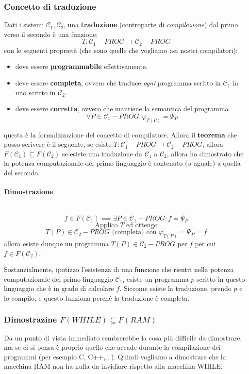\documentclass{article}
\begin{document}
\subsubsection{Concetto di traduzione}
Dati i sistemi $\mathcal{C}_1,\mathcal{C}_2$, una \textbf{traduzione} (controparte di \textit{compilazione}) dal primo verso il secondo è
una funzione:
$$T:\mathcal{C}_1-PROG\rightarrow\mathcal{C}_2-PROG$$
con le seguenti proprietà (che sono quelle che vogliamo nei nostri compilatori):
\begin{itemize}
    \item deve essere \textbf{programmabile} effettivamente.
    \item deve essere \textbf{completa}, ovvero che traduce \textit{ogni} programma scritto in $\mathcal{C}_1$ in
          uno scritto in $\mathcal{C}_2$.
    \item deve essere \textbf{corretta}, ovvero che mantiene la semantica del programma
          $$\forall P\in\mathcal{C}_1-PROG :\varphi_{T(P)}=\Psi_P$$
\end{itemize}
questa è la formalizzazione del concetto di compilatore. Allora il \textbf{teorema} che posso scrivere
è il seguente, se esiste $T:\mathcal{C}_1-PROG\rightarrow\mathcal{C}_2-PROG$, allora $F(\mathcal{C}_1)\subseteq F(\mathcal{C}_2)$
se esiste una traduzione da $\mathcal{C}_1$ a $\mathcal{C}_2$, allora ho dimostrato che la potenza computazionale del
primo linguaggio è contenuto (o uguale) a quella del secondo.

\paragraph{Dimostrazione}\mbox{}\\
$$f\in F(\mathcal{C}_1)\implies\exists P\in\mathcal{C}_1-PROG:f=\Psi_P$$
$$\text{Applico } T \text{ ed ottengo}$$
$$T(P)\in\mathcal{C}_2-PROG\text{ (completa) con }\varphi_{T(P)}=\Psi_P=f$$
allora esiste dunque un programma $T(P)\in\mathcal{C}_2-PROG$ per $f$ per cui
$f\in F(\mathcal{C}_2)$.

Sostanzialmente, ipotizzo l'esistenza di una funzione che rientri nella potenza computazionale
del primo linguaggio $\mathcal{C}_1$,
esiste un programma $p$ scritto in questo linguaggio che è in grado di calcolare $f$.
Siccome esiste la traduzione, prendo $p$ e lo compilo, e questo funziona perché la traduzione è completa.

\subsubsection{Dimostrazine $F(WHILE)\subseteq F(RAM)$}
Da un punto di vista immediato sembrerebbe la cosa più difficile da dimostrare, ma se ci si pensa
è proprio quello che accade durante la compilazione dei programmi (per esempio C, C++,...).
Quindi vogliamo a dimostrare che la macchina RAM non ha nulla da invidiare rispetto alla macchina WHILE.
\end{document}
